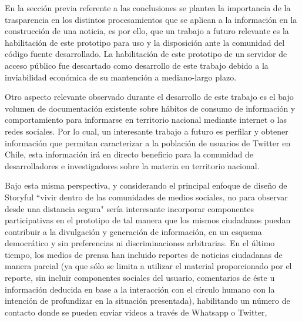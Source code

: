 En la sección previa referente a las conclusiones se plantea la importancia de la trasparencia en los distintos procesamientos que se aplican a la información en la construcción de una noticia, es por ello, que un trabajo a futuro relevante es la habilitación de este prototipo para uso y la disposición ante la comunidad del código fuente desarrollado. La habilitación de este prototipo de un servidor de acceso público fue descartado como desarrollo de este trabajo debido a la inviabilidad económica de su mantención a mediano-largo plazo.
	
Otro aspecto relevante observado durante el desarrollo de este trabajo es el bajo volumen de documentación existente sobre hábitos de consumo de información y comportamiento para informarse en territorio nacional mediante internet o las redes sociales. Por lo cual, un interesante trabajo a futuro es perfilar y obtener información que permitan caracterizar a la población de usuarios de Twitter en Chile, esta información irá en directo beneficio para la comunidad de desarrolladores e investigadores sobre la materia en territorio nacional. 

Bajo esta misma perspectiva, y considerando el principal enfoque de diseño de Storyful “vivir dentro de las comunidades de medios sociales, no para observar desde una distancia segura" sería interesante incorporar componentes participativas en el prototipo  de tal manera que los mismos ciudadanos puedan contribuir a la divulgación y generación de información, en un esquema democrático y sin preferencias ni discriminaciones arbitrarias. En el último tiempo, los medios de prensa han incluido reportes de noticias ciudadanas de manera parcial (ya que sólo se limita a utilizar el material proporcionado por el reporte, sin incluir componentes sociales del usuario, comentarios de éste u información deducida en base a la interacción con el círculo humano con la intención de profundizar en la situación presentada), habilitando un número de contacto donde se pueden enviar videos a través de Whatsapp o Twitter,

	
	

	

